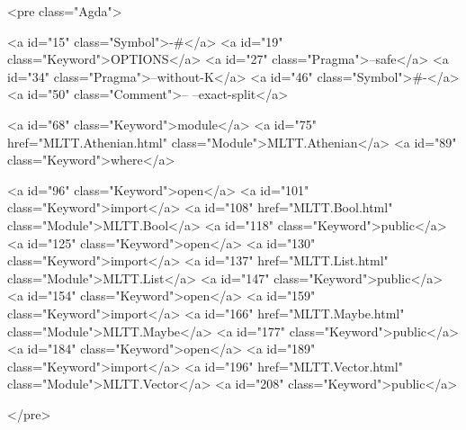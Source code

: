 <pre class="Agda">

<a id="15" class="Symbol">{-#</a> <a id="19" class="Keyword">OPTIONS</a> <a id="27" class="Pragma">--safe</a> <a id="34" class="Pragma">--without-K</a> <a id="46" class="Symbol">#-}</a> <a id="50" class="Comment">-- --exact-split</a>

<a id="68" class="Keyword">module</a> <a id="75" href="MLTT.Athenian.html" class="Module">MLTT.Athenian</a> <a id="89" class="Keyword">where</a>

<a id="96" class="Keyword">open</a> <a id="101" class="Keyword">import</a> <a id="108" href="MLTT.Bool.html" class="Module">MLTT.Bool</a> <a id="118" class="Keyword">public</a>
<a id="125" class="Keyword">open</a> <a id="130" class="Keyword">import</a> <a id="137" href="MLTT.List.html" class="Module">MLTT.List</a> <a id="147" class="Keyword">public</a>
<a id="154" class="Keyword">open</a> <a id="159" class="Keyword">import</a> <a id="166" href="MLTT.Maybe.html" class="Module">MLTT.Maybe</a> <a id="177" class="Keyword">public</a>
<a id="184" class="Keyword">open</a> <a id="189" class="Keyword">import</a> <a id="196" href="MLTT.Vector.html" class="Module">MLTT.Vector</a> <a id="208" class="Keyword">public</a>

</pre>

